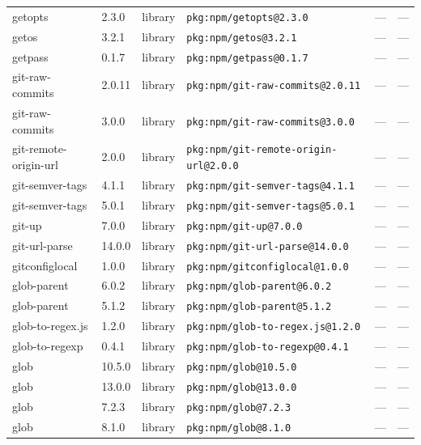 \documentclass[11pt,a4paper]{article}
\begin{document}
\begin{longtable}{|p{4cm}|p{2cm}|p{1.6cm}|p{5cm}|p{1.5cm}|p{3.5cm}|}
\raggedright getopts & 2.3.0 & library & \small\texttt{pkg:npm/getopts@2.3.0} & — & \small — \\
\raggedright getos & 3.2.1 & library & \small\texttt{pkg:npm/getos@3.2.1} & — & \small — \\
\raggedright getpass & 0.1.7 & library & \small\texttt{pkg:npm/getpass@0.1.7} & — & \small — \\
\raggedright git-raw-commits & 2.0.11 & library & \small\texttt{pkg:npm/git-raw-commits@2.0.11} & — & \small — \\
\raggedright git-raw-commits & 3.0.0 & library & \small\texttt{pkg:npm/git-raw-commits@3.0.0} & — & \small — \\
\raggedright git-remote-origin-url & 2.0.0 & library & \small\texttt{pkg:npm/git-remote-origin-url@2.0.0} & — & \small — \\
\raggedright git-semver-tags & 4.1.1 & library & \small\texttt{pkg:npm/git-semver-tags@4.1.1} & — & \small — \\
\raggedright git-semver-tags & 5.0.1 & library & \small\texttt{pkg:npm/git-semver-tags@5.0.1} & — & \small — \\
\raggedright git-up & 7.0.0 & library & \small\texttt{pkg:npm/git-up@7.0.0} & — & \small — \\
\raggedright git-url-parse & 14.0.0 & library & \small\texttt{pkg:npm/git-url-parse@14.0.0} & — & \small — \\
\raggedright gitconfiglocal & 1.0.0 & library & \small\texttt{pkg:npm/gitconfiglocal@1.0.0} & — & \small — \\
\raggedright glob-parent & 6.0.2 & library & \small\texttt{pkg:npm/glob-parent@6.0.2} & — & \small — \\
\raggedright glob-parent & 5.1.2 & library & \small\texttt{pkg:npm/glob-parent@5.1.2} & — & \small — \\
\raggedright glob-to-regex.js & 1.2.0 & library & \small\texttt{pkg:npm/glob-to-regex.js@1.2.0} & — & \small — \\
\raggedright glob-to-regexp & 0.4.1 & library & \small\texttt{pkg:npm/glob-to-regexp@0.4.1} & — & \small — \\
\raggedright glob & 10.5.0 & library & \small\texttt{pkg:npm/glob@10.5.0} & — & \small — \\
\raggedright glob & 13.0.0 & library & \small\texttt{pkg:npm/glob@13.0.0} & — & \small — \\
\raggedright glob & 7.2.3 & library & \small\texttt{pkg:npm/glob@7.2.3} & — & \small — \\
\raggedright glob & 8.1.0 & library & \small\texttt{pkg:npm/glob@8.1.0} & — & \small — \\

\end{longtable}
\end{document}
